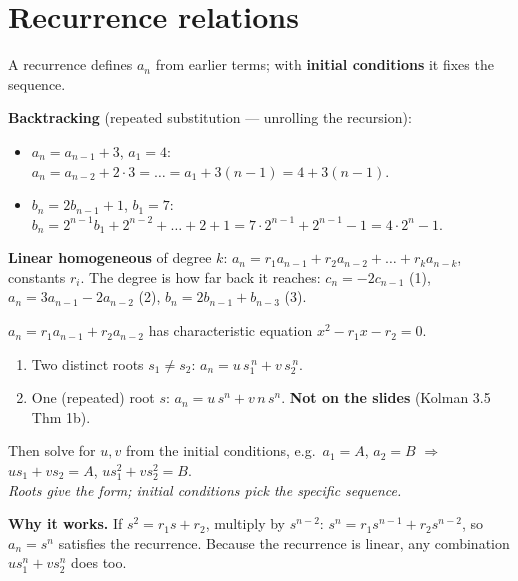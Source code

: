 \documentclass{fkt-notes}
\newcommand{\src}[1]{\par\noindent{\small\itshape Source: #1}\par\smallskip}
\newcommand{\kolman}[1]{\setcounter{section}{\numexpr#1-1\relax}}
\theoremstyle{definition}
\begin{document}
\kolman{5}
\section{Recurrence relations}\src{Kolman 3.5}\label{qg:rec}
%

A recurrence defines $a_n$ from earlier terms; with \textbf{initial
  conditions} it fixes the sequence.

\textbf{Backtracking} (repeated substitution --- unrolling the recursion):
\begin{itemize}
  \item $a_n=a_{n-1}+3$, $a_1=4$: $a_n=a_{n-2}+2\cdot3=\dots=a_1+3(n-1)=4+3(n-1)$.
  \item $b_n=2b_{n-1}+1$, $b_1=7$: $b_n=2^{n-1}b_1+2^{n-2}+\dots+2+1
          =7\cdot2^{n-1}+2^{n-1}-1=4\cdot2^n-1$.
\end{itemize}

\textbf{Linear homogeneous} of degree $k$:
$a_n=r_1a_{n-1}+r_2a_{n-2}+\dots+r_ka_{n-k}$, constants $r_i$. The degree
is how far back it reaches: $c_n=-2c_{n-1}$ (1),
$a_n=3a_{n-1}-2a_{n-2}$ (2), $b_n=2b_{n-1}+b_{n-3}$ (3).

\begin{rulebox}[title=Theorem 3.5.1 (degree 2)]
  $a_n=r_1a_{n-1}+r_2a_{n-2}$ has characteristic equation
  $x^2-r_1x-r_2=0$.
  \begin{enumerate}[label=(\alph*)]
    \item Two distinct roots $s_1\neq s_2$: \quad $a_n=u\,s_1^{\,n}+v\,s_2^{\,n}$.
    \item One (repeated) root $s$: \quad $a_n=u\,s^n+v\,n\,s^n$.
          \hfill\textbf{Not on the slides} (Kolman 3.5 Thm 1b).
  \end{enumerate}
  Then solve for $u,v$ from the initial conditions, e.g.\
  $a_1=A$, $a_2=B$ $\Rightarrow$ $us_1+vs_2=A$, $us_1^2+vs_2^2=B$.\\
  \emph{Roots give the form; initial conditions pick the specific sequence.}
\end{rulebox}

\textbf{Why it works.} If $s^2=r_1s+r_2$, multiply by $s^{n-2}$:
$s^n=r_1s^{n-1}+r_2s^{n-2}$, so $a_n=s^n$ satisfies the recurrence.
Because the recurrence is linear, any combination $us_1^n+vs_2^n$ does too.
\end{document}
